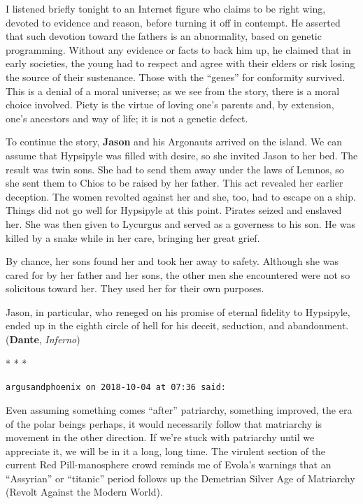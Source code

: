 I listened briefly tonight to an Internet figure who claims to be right wing, devoted to evidence and reason, before turning it off in contempt. He asserted that such devotion toward the fathers is an abnormality, based on genetic programming. Without any evidence or facts to back him up, he claimed that in early societies, the young had to respect and agree with their elders or risk losing the source of their sustenance. Those with the ``genes'' for conformity survived. This is a denial of a moral universe; as we see from the story, there is a moral choice involved. Piety is the virtue of loving one's parents and, by extension, one's ancestors and way of life; it is not a genetic defect.

To continue the story, \textbf{Jason} and his Argonauts arrived on the island. We can assume that Hypsipyle was filled with desire, so she invited Jason to her bed. The result was twin sons. She had to send them away under the laws of Lemnos, so she sent them to Chios to be raised by her father. This act revealed her earlier deception. The women revolted against her and she, too, had to escape on a ship. Things did not go well for Hypsipyle at this point. Pirates seized and enslaved her. She was then given to Lycurgus and served as a governess to his son. He was killed by a snake while in her care, bringing her great grief.

By chance, her sons found her and took her away to safety. Although she was cared for by her father and her sons, the other men she encountered were not so solicitous toward her. They used her for their own purposes.

Jason, in particular, who reneged on his promise of eternal fidelity to Hypsipyle, ended up in the eighth circle of hell for his deceit, seduction, and abandonment. (\textbf{Dante}, \emph{Inferno})



\begin{center}* * *\end{center}

\begin{footnotesize}
\begin{sffamily}
\texttt{argusandphoenix on 2018-10-04 at 07:36 said:}

Even assuming something comes ``after'' patriarchy, something improved, the era of the polar beings perhaps, it would necessarily follow that matriarchy is movement in the other direction. If we're stuck with patriarchy until we appreciate it, we will be in it a long, long time. The virulent section of the current Red Pill-manosphere crowd reminds me of Evola's warnings that an ``Assyrian'' or ``titanic'' period follows up the Demetrian Silver Age of Matriarchy (Revolt Against the Modern World).

\hfill

\end{sffamily}
\end{footnotesize}

